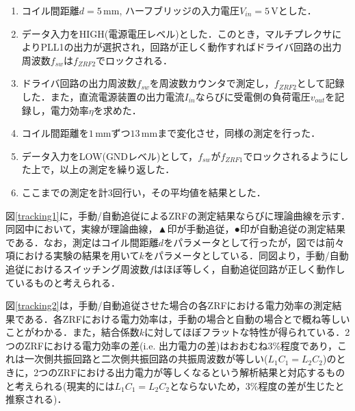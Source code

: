 \begin{enumerate}
  \item コイル間距離$d =5 \, \mathrm{mm}$, ハーフブリッジの入力電圧$V_{in}=5 \, \mathrm{V}$とした．
  \item データ入力をHIGH(電源電圧レベル)とした．このとき，マルチプレクサによりPLL1の出力が選択され，回路が正しく動作すればドライバ回路の出力周波数$f_{sw}$は$f_{ZRF2}$でロックされる．
  \item ドライバ回路の出力周波数$f_{sw}$を周波数カウンタで測定し，$f_{ZRF2}$として記録した．また，直流電源装置の出力電流$I_{in}$ならびに受電側の負荷電圧$v_{out}$を記録し，電力効率$\eta$を求めた．
  \item コイル間距離を$1 \, \mathrm{mm}$ずつ$13 \, \mathrm {mm}$まで変化させ，同様の測定を行った．
  \item データ入力をLOW(GNDレベル)として，$f_{sw}$が$f_{ZRF1}$でロックされるようにした上で，以上の測定を繰り返した．
  \item ここまでの測定を計3回行い，その平均値を結果とした．
\end{enumerate}
図\ref{tracking1}に，手動/自動追従によるZRFの測定結果ならびに理論曲線を示す．同図中において，実線が理論曲線，▲印が手動追従，●印が自動追従の測定結果である．なお，測定はコイル間距離$d$をパラメータとして行ったが，図では前々項における実験の結果を用いて$k$をパラメータとしている．同図より，手動/自動追従におけるスイッチング周波数$f$はほぼ等しく，自動追従回路が正しく動作しているものと考えられる．\par
図\ref{tracking2}は，手動/自動追従させた場合の各ZRFにおける電力効率の測定結果である．各ZRFにおける電力効率は，手動の場合と自動の場合とで概ね等しいことがわかる．また，結合係数$k$に対してほぼフラットな特性が得られている．2つのZRFにおける電力効率の差(i.e. 出力電力の差)はおおむね3\%程度であり，これは一次側共振回路と二次側共振回路の共振周波数が等しい($L_1C_1=L_2C_2$)のときに，2つのZRFにおける出力電力が等しくなるという解析結果と対応するものと考えられる(現実的には$L_1C_1=L_2C_2$とならないため，3\%程度の差が生じたと推察される)．

\vspace{1cm}

